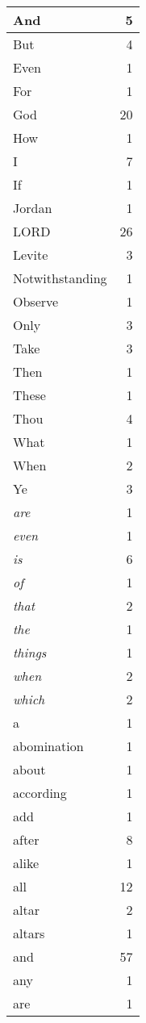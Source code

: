\begin{center}
\begin{longtable}{l|r}
\hline \hline
\endlastfoot
And & 5 \\ \hline
But & 4 \\ \hline
Even & 1 \\ \hline
For & 1 \\ \hline
God & 20 \\ \hline
How & 1 \\ \hline
I & 7 \\ \hline
If & 1 \\ \hline
Jordan & 1 \\ \hline
LORD & 26 \\ \hline
Levite & 3 \\ \hline
Notwithstanding & 1 \\ \hline
Observe & 1 \\ \hline
Only & 3 \\ \hline
Take & 3 \\ \hline
Then & 1 \\ \hline
These & 1 \\ \hline
Thou & 4 \\ \hline
What & 1 \\ \hline
When & 2 \\ \hline
Ye & 3 \\ \hline
\emph{are} & 1 \\ \hline
\emph{even} & 1 \\ \hline
\emph{is} & 6 \\ \hline
\emph{of} & 1 \\ \hline
\emph{that} & 2 \\ \hline
\emph{the} & 1 \\ \hline
\emph{things} & 1 \\ \hline
\emph{when} & 2 \\ \hline
\emph{which} & 2 \\ \hline
a & 1 \\ \hline
abomination & 1 \\ \hline
about & 1 \\ \hline
according & 1 \\ \hline
add & 1 \\ \hline
after & 8 \\ \hline
alike & 1 \\ \hline
all & 12 \\ \hline
altar & 2 \\ \hline
altars & 1 \\ \hline
and & 57 \\ \hline
any & 1 \\ \hline
are & 1 \\ \hline

\end{longtable}
\end{center}
